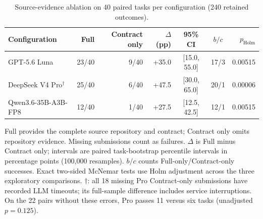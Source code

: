 \begin{table}[tbp]
 \caption{Source-evidence ablation on 40 paired tasks per configuration (240 retained outcomes).}
 \label{tab:source-ablation}
 \centering\footnotesize
 \setlength{\tabcolsep}{3pt}
 \begin{tabularx}{\linewidth}{@{}Xrrrccr@{}}
 \toprule
 Configuration & Full & Contract only & $\Delta$ (pp) & 95\% CI & $b/c$ & $p_{\mathrm{Holm}}$ \\
 \midrule
 GPT-5.6 Luna & 23/40 & 9/40 & +35.0 & [15.0, 55.0] & 17/3 & 0.00515 \\
 DeepSeek V4 Pro$^{\dagger}$ & 25/40 & 6/40 & +47.5 & [30.0, 65.0] & 20/1 & 0.00006 \\
 Qwen3.6-35B-A3B-FP8 & 12/40 & 1/40 & +27.5 & [12.5, 42.5] & 12/1 & 0.00515 \\
 \bottomrule
 \end{tabularx}
 \par\smallskip\begin{minipage}{\linewidth}\footnotesize
 Full provides the complete source repository and contract; Contract only omits repository evidence. Missing submissions count as failures. $\Delta$ is Full minus Contract only; intervals are paired task-bootstrap percentile intervals in percentage points (100,000 resamples). $b/c$ counts Full-only/Contract-only successes. Exact two-sided McNemar tests use Holm adjustment across the three exploratory comparisons.
 $\dagger$: all 18 missing Pro Contract-only submissions have recorded LLM timeouts; its full-sample difference includes service interruptions. On the 22 pairs without these errors, Pro passes 11 versus six tasks (unadjusted $p=0.125$).
 \end{minipage}
\end{table}
